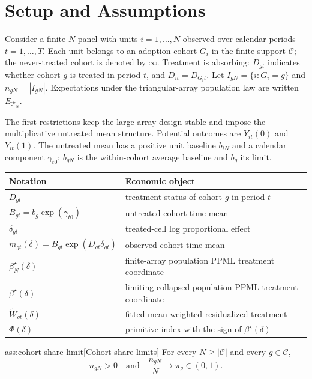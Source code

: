 \section{Setup and Assumptions}

Consider a finite-\(N\) panel with units \(i=1,\ldots,N\) observed over calendar periods \(t=1,\ldots,T\). Each unit belongs to an adoption cohort \(G_i\) in the finite support \(\mathcal C\); the never-treated cohort is denoted by \(\infty\). Treatment is absorbing: \(D_{gt}\) indicates whether cohort \(g\) is treated in period \(t\), and \(D_{it}=D_{G_i t}\). Let \(I_{gN}=\{i:G_i=g\}\) and \(n_{gN}=|I_{gN}|\). Expectations under the triangular-array population law are written \(E_{\mathcal P_N}\).

The first restrictions keep the large-array design stable and impose the multiplicative untreated mean structure. Potential outcomes are \(Y_{it}(0)\) and \(Y_{it}(1)\). The untreated mean has a positive unit baseline \(b_{iN}\) and a calendar component \(\gamma_{t0}\); \(\bar b_{gN}\) is the within-cohort average baseline and \(\bar b_g\) its limit.

\begin{center}
\begin{tabular}{ll}
\hline
Notation & Economic object\\
\hline
\(D_{gt}\) & treatment status of cohort \(g\) in period \(t\)\\
\(B_{gt}=\bar b_g\exp(\gamma_{t0})\) & untreated cohort-time mean\\
\(\delta_{gt}\) & treated-cell log proportional effect\\
\(m_{gt}(\delta)=B_{gt}\exp(D_{gt}\delta_{gt})\) & observed cohort-time mean\\
\(\beta_N^\star(\delta)\) & finite-array population PPML treatment coordinate\\
\(\beta^\star(\delta)\) & limiting collapsed population PPML treatment coordinate\\
\(\widetilde W_{gt}(\delta)\) & fitted-mean-weighted residualized treatment\\
\(\Phi(\delta)\) & primitive index with the sign of \(\beta^\star(\delta)\)\\
\hline
\end{tabular}
\end{center}

\begin{assumptionv}{ass:cohort-share-limit}[Cohort share limits]
For every \(N\ge |\mathcal C|\) and every \(g\in\mathcal C\),
\[
n_{gN}>0
\quad\text{and}\quad
\frac{n_{gN}}{N}\to \pi_g\in(0,1).
\]
\end{assumptionv}

